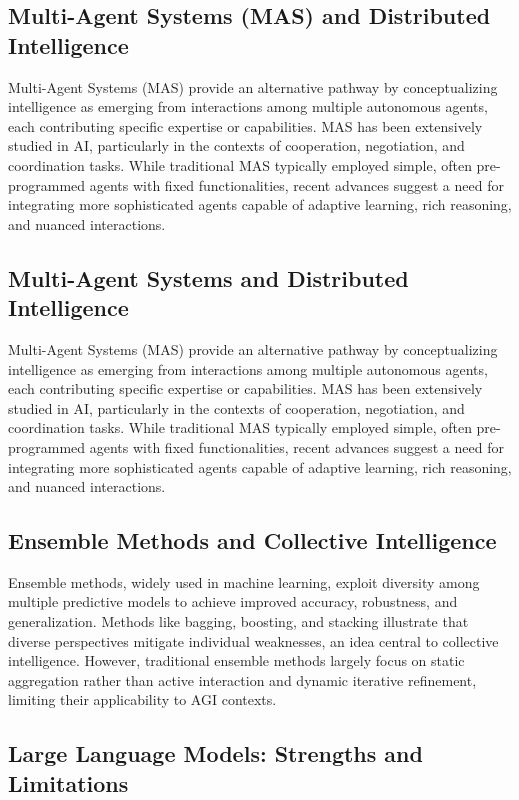 \documentclass[12pt]{amsart}
\begin{document}
\subsection{Multi-Agent Systems (MAS) and Distributed Intelligence}
Multi-Agent Systems (MAS) provide an alternative pathway by conceptualizing intelligence as emerging from interactions among multiple autonomous agents, each contributing specific expertise or capabilities. MAS has been extensively studied in AI, particularly in the contexts of cooperation, negotiation, and coordination tasks. While traditional MAS typically employed simple, often pre-programmed agents with fixed functionalities, recent advances suggest a need for integrating more sophisticated agents capable of adaptive learning, rich reasoning, and nuanced interactions.





\subsection{Multi-Agent Systems and Distributed Intelligence}
Multi-Agent Systems (MAS) provide an alternative pathway by conceptualizing intelligence as emerging from interactions among multiple autonomous agents, each contributing specific expertise or capabilities. MAS has been extensively studied in AI, particularly in the contexts of cooperation, negotiation, and coordination tasks. While traditional MAS typically employed simple, often pre-programmed agents with fixed functionalities, recent advances suggest a need for integrating more sophisticated agents capable of adaptive learning, rich reasoning, and nuanced interactions.


\subsection{Ensemble Methods and Collective Intelligence}
Ensemble methods, widely used in machine learning, exploit diversity among multiple predictive models to achieve improved accuracy, robustness, and generalization. Methods like bagging, boosting, and stacking illustrate that diverse perspectives mitigate individual weaknesses, an idea central to collective intelligence. However, traditional ensemble methods largely focus on static aggregation rather than active interaction and dynamic iterative refinement, limiting their applicability to AGI contexts.


\subsection{Large Language Models: Strengths and Limitations}
\end{document}
